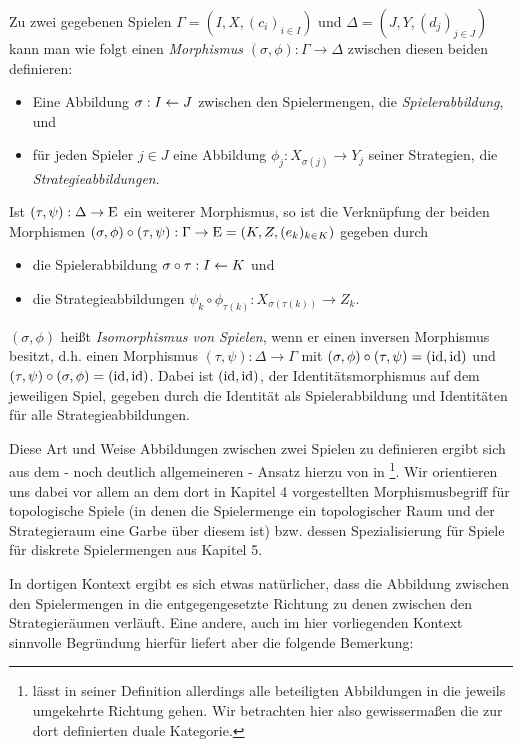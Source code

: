 \begin{defn}\label{defn:MorphismusVonSpielen}
	Zu zwei gegebenen Spielen $\Gamma = (I, X, (c_i)_{i\in I})$ und $\Delta = (J, Y, (d_j)_{j\in J})$ kann man wie folgt einen \emph{Morphismus} $(\sigma, \phi): \Gamma \to \Delta$ zwischen diesen beiden definieren:
	\begin{itemize}
		\item Eine Abbildung $\sigma: I \leftarrow J$ zwischen den Spielermengen, die \emph{Spielerabbildung}, und
		\item für jeden Spieler $j \in J$ eine Abbildung $\phi_j: X_{\sigma(j)} \to Y_j$ seiner Strategien, die \emph{Strategieabbildungen}.
	\end{itemize}
	Ist $(\tau, \psi): \Delta \to \mathrm{E}$ ein weiterer Morphismus, so ist die Verknüpfung der beiden Morphismen $(\sigma, \phi) \circ (\tau, \psi): \Gamma \to \mathrm{E} = (K, Z, (e_k)_{k \in K})$ gegeben durch
	\begin{itemize}
		\item die Spielerabbildung $\sigma\circ\tau: I \leftarrow K$ und
		\item die Strategieabbildungen $\psi_k \circ \phi_{\tau(k)}: X_{\sigma(\tau(k))} \to Z_k$.
	\end{itemize}
	$(\sigma, \phi)$ heißt \emph{Isomorphismus von Spielen}, wenn er einen inversen Morphismus besitzt, d.h. einen Morphismus $(\tau, \psi): \Delta \to \Gamma$ mit $(\sigma, \phi) \circ (\tau, \psi) = (\mathrm{id}, \mathrm{id})$ und $(\tau, \psi) \circ (\sigma, \phi) = (\mathrm{id}, \mathrm{id})$. Dabei ist $(\mathrm{id}, \mathrm{id})$, der Identitätsmorphismus auf dem jeweiligen Spiel, gegeben durch die Identität als Spielerabbildung und Identitäten für alle Strategieabbildungen.
\end{defn}

Diese Art und Weise Abbildungen zwischen zwei Spielen zu definieren ergibt sich aus dem - noch deutlich allgemeineren - Ansatz hierzu von \citeauthor{LapGameCat} in \cite{LapGameCat}\footnote{\citeauthor{LapGameCat} lässt in seiner Definition allerdings alle beteiligten Abbildungen in die jeweils umgekehrte Richtung gehen. Wir betrachten hier also gewissermaßen die zur dort definierten duale Kategorie.}. Wir orientieren uns dabei vor allem an dem dort in Kapitel 4 vorgestellten Morphismusbegriff für topologische Spiele (in denen die Spielermenge ein topologischer Raum und der Strategieraum eine Garbe über diesem ist) bzw. dessen Spezialisierung für Spiele für diskrete Spielermengen aus Kapitel 5. 

In dortigen Kontext ergibt es sich etwas natürlicher, dass die Abbildung zwischen den Spielermengen in die entgegengesetzte Richtung zu denen zwischen den Strategieräumen verläuft. Eine andere, auch im hier vorliegenden Kontext sinnvolle Begründung hierfür liefert aber die folgende Bemerkung:

